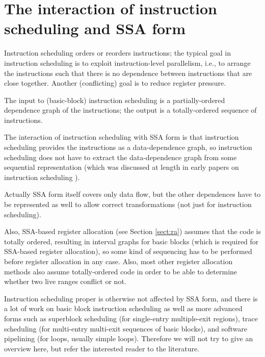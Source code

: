 \chapter{The interaction of instruction scheduling and SSA form }
%

Instruction scheduling orders or reorders instructions; the typical
goal in instruction scheduling is to exploit instruction-level
parallelism, i.e., to arrange the instructions such that there is no
dependence between instructions that are close together.  Another
(conflicting) goal is to reduce register pressure.

The input to (basic-block) instruction scheduling is a
partially-ordered dependence graph of the instructions; the output is
a totally-ordered sequence of instructions.

The interaction of instruction scheduling with SSA form is that
instruction scheduling provides the instructions as a data-dependence
graph, so instruction scheduling does not have to extract the
data-dependence graph from some sequential representation (which was
discussed at length in early papers on instruction scheduling
\cite{...}).

Actually SSA form itself covers only data flow, but the other
dependences have to be represented as well to allow correct
transformations (not just for instruction scheduling).

Also, SSA-based register allocation (see Section \ref{sect:ra})
assumes that the code is totally ordered, resulting in interval graphs
for basic blocks (which is required for SSA-based register
allocation), so some kind of sequencing has to be performed before
register allocation in any case.  Also, most other register allocation
methods also assume totally-ordered code in order to be able to
determine whether two live ranges conflict or not.

Instruction scheduling proper is otherwise not affected by SSA form,
and there is a lot of work on basic block instruction scheduling
\cite{...} as well as more advanced forms such as superblock
scheduling \cite{...} (for single-entry multiple-exit regions), trace
scheduling \cite{...} (for multi-entry multi-exit sequences of basic
blocks), and software pipelining \cite{...} (for loops, usually simple
loops).  Therefore we will not try to give an overview here, but refer
the interested reader to the literature.
